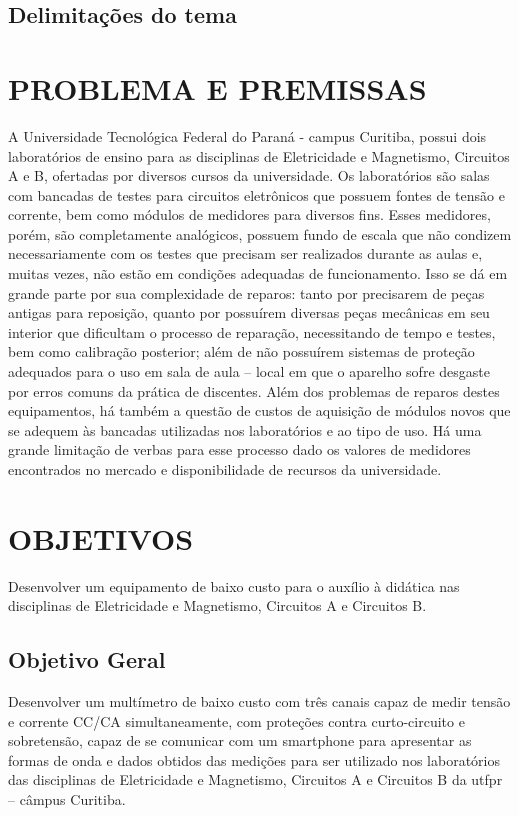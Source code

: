 \subsection{Delimitações do tema}\label{subsec:del-tema}


\section{PROBLEMA E PREMISSAS}\label{sec:probpremiss}
A Universidade Tecnológica Federal do Paraná - campus Curitiba, possui dois laboratórios de ensino para as disciplinas de Eletricidade e Magnetismo, Circuitos A e B, ofertadas por diversos cursos da universidade. Os laboratórios são salas com bancadas de testes para circuitos eletrônicos que possuem fontes de tensão e corrente, bem como módulos de medidores para diversos fins.
Esses medidores, porém, são completamente analógicos, possuem fundo de escala que não condizem necessariamente com os testes que precisam ser realizados durante as aulas e, muitas vezes, não estão em condições adequadas de funcionamento. Isso se dá em grande parte por sua complexidade de reparos: tanto por precisarem de peças antigas para reposição, quanto por possuírem diversas peças mecânicas em seu interior que dificultam o processo de reparação, necessitando de tempo e testes, bem como calibração posterior; além de não possuírem sistemas de proteção adequados para o uso em sala de aula – local em que o aparelho sofre desgaste por erros comuns da prática de discentes.
Além dos problemas de reparos destes equipamentos, há também a questão de custos de aquisição de módulos novos que se adequem às bancadas utilizadas nos laboratórios e ao tipo de uso. Há uma grande limitação de verbas para esse processo dado os valores de medidores encontrados no mercado e disponibilidade de recursos da universidade.

\section{OBJETIVOS}\label{sec:objetivos}
Desenvolver um equipamento de baixo custo para o auxílio à didática nas disciplinas de Eletricidade e Magnetismo, Circuitos A e Circuitos B.

\subsection{Objetivo Geral}\label{sec:objgeral}
Desenvolver um multímetro de baixo custo com três canais capaz de medir tensão e corrente \gls{CC}/\gls{CA} simultaneamente, com proteções contra curto-circuito e sobretensão, capaz de se comunicar com um smartphone para apresentar as formas de onda e dados obtidos das medições para ser utilizado nos laboratórios das disciplinas de Eletricidade e Magnetismo, Circuitos A e Circuitos B da \gls{utfpr} – câmpus Curitiba.


